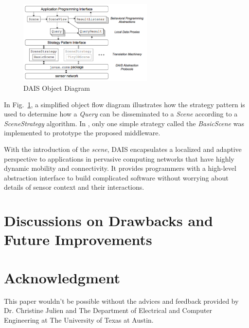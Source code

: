 \documentclass[11pt,onecolumn]{article}
\begin{document}
\begin{figure}
\vspace{-20pt}
  \begin{center}
    \includegraphics[width=0.6\textwidth]{resources/dais_objects.png}
  \end{center}
  \vspace{-20pt}
  \caption{DAIS Object Diagram\cite{dais} \label{dais_objects}}
    \vspace{-10pt}
\end{figure}

In Fig.~\ref{dais_objects}, a simplified object flow diagram illustrates how the strategy pattern\cite{gamma1993design} is used to determine how a {\em Query} can be disseminated to a {\em Scene} according to a {\em SceneStrategy} algorithm. In \cite{dais}, only one simple strategy called the {\em BasicScene} was implemented to prototype the proposed middleware. 

With the introduction of the {\em scene}, DAIS encapsulates a localized and adaptive perspective to applications in pervasive computing networks that have highly dynamic mobility and connectivity. It provides programmers with a high-level abstraction interface to build complicated software without worrying about details of sensor context and their interactions.
	
\section{Discussions on Drawbacks and Future Improvements}


\section*{Acknowledgment}
This paper wouldn't be possible without the advices and feedback provided by Dr. Christine Julien and The Department of Electrical and Computer Engineering at The University of Texas at Austin.



\end{document}
